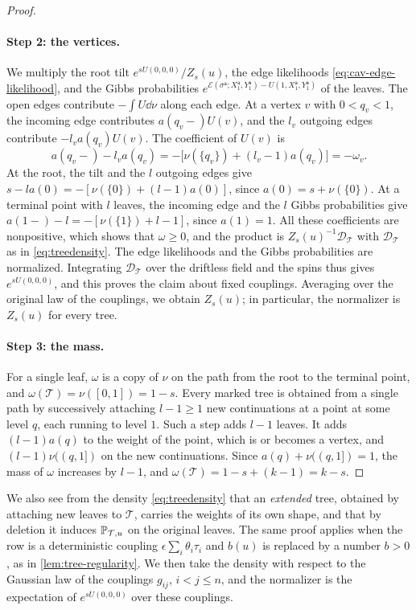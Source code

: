 \begin{proof}
\paragraph{Step 2: the vertices.}
We multiply the root tilt $e^{sU(0,0,0)}/Z_s(u)$, the edge likelihoods
\eqref{eq:cav-edge-likelihood}, and the Gibbs probabilities
$e^{\mathcal E(\sigma^{\mathsf a};X^{\mathsf a}_1,Y^{\mathsf a}_1)
-U(1,X^{\mathsf a}_1,Y^{\mathsf a}_1)}$ of the leaves. The open edges
contribute $-\int U\dd\nu$ along each edge. At a vertex $v$ with
$0<q_v<1$, the incoming edge contributes $a(q_v-)U(v)$, and the $l_v$
outgoing edges contribute $-l_va(q_v)U(v)$. The coefficient of $U(v)$ is
\[
 a(q_v-)-l_va(q_v)=-\bigl[\nu(\{q_v\})+(l_v-1)a(q_v)\bigr]=-\omega_v .
\]
At the root, the tilt and the $l$ outgoing edges give
$s-la(0)=-[\nu(\{0\})+(l-1)a(0)]$, since $a(0)=s+\nu(\{0\})$. At a
terminal point with $l$ leaves, the incoming edge and the $l$ Gibbs
probabilities give $a(1-)-l=-[\nu(\{1\})+l-1]$, since $a(1)=1$. All these
coefficients are nonpositive, which shows that $\omega\ge0$, and the
product is $Z_s(u)^{-1}\mathscr D_{\mathcal T}$ with
$\mathscr D_{\mathcal T}$ as in \eqref{eq:treedensity}. The edge
likelihoods and the Gibbs probabilities are normalized. Integrating
$\mathscr D_{\mathcal T}$ over the driftless field and the spins thus
gives $e^{sU(0,0,0)}$, and this proves the claim about fixed couplings.
Averaging over the original law of the couplings, we obtain $Z_s(u)$; in
particular, the normalizer is $Z_s(u)$ for every tree.

\paragraph{Step 3: the mass.}
For a single leaf, $\omega$ is a copy of $\nu$ on the path from the root
to the terminal point, and $\omega(\mathcal T)=\nu([0,1])=1-s$. Every
marked tree is obtained from a single path by successively attaching
$l-1\ge1$ new continuations at a point at some level $q$, each running to
level $1$. Such a step adds $l-1$ leaves. It adds $(l-1)a(q)$ to the
weight of the point, which is or becomes a vertex, and $(l-1)\nu((q,1])$
on the new continuations. Since $a(q)+\nu((q,1])=1$, the mass of $\omega$
increases by $l-1$, and $\omega(\mathcal T)=1-s+(k-1)=k-s$.
\end{proof}

We also see from the density \eqref{eq:treedensity} that an \emph{extended}
tree, obtained by attaching new leaves to $\mathcal T$, carries the
weights of its own shape, and that by deletion it induces
$\mathbb P_{\mathcal T,u}$ on the original leaves. The same proof applies when
the row is a deterministic coupling $\epsilon\sum_i\theta_i\tau_i$ and
$b(u)$ is replaced by a number $b>0$, as in \cref{lem:tree-regularity}.
We then take the density with respect to the Gaussian law of the
couplings $g_{ij}$, $i<j\le n$, and the normalizer is the expectation of
$e^{sU(0,0,0)}$ over these couplings.

